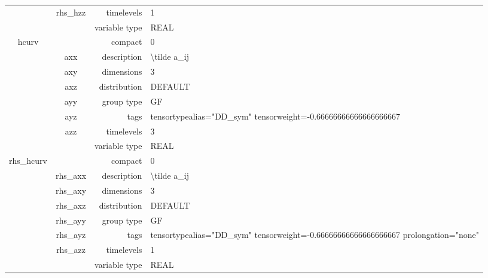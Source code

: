 \begin{tabular*}{150mm}{|c|c@{\extracolsep{\fill}}|rl|}
 & rhs\_hzz & timelevels & 1 \\ 
 &  & variable type & REAL \\ 
\hline 
hcurv &  & compact & 0 \\ 
 & axx & description & {\textbackslash}tilde a\_ij \\ 
 & axy & dimensions & 3 \\ 
 & axz & distribution & DEFAULT \\ 
 & ayy & group type & GF \\ 
 & ayz & tags & tensortypealias="DD\_sym" tensorweight=-0.66666666666666666667 \\ 
 & azz & timelevels & 3 \\ 
 &  & variable type & REAL \\ 
\hline 
rhs\_hcurv &  & compact & 0 \\ 
 & rhs\_axx & description & {\textbackslash}tilde a\_ij \\ 
 & rhs\_axy & dimensions & 3 \\ 
 & rhs\_axz & distribution & DEFAULT \\ 
 & rhs\_ayy & group type & GF \\ 
 & rhs\_ayz & tags & tensortypealias="DD\_sym" tensorweight=-0.66666666666666666667 prolongation="none" \\ 
 & rhs\_azz & timelevels & 1 \\ 
 &  & variable type & REAL \\ 
\hline 
\end{tabular*} 



\vspace{5mm}
\vspace{5mm}

